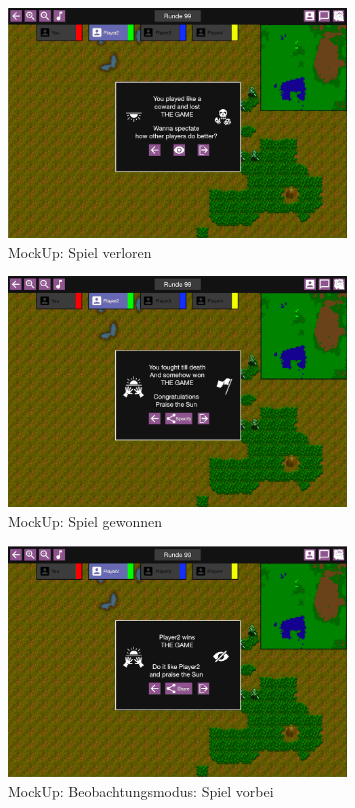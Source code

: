 \documentclass[12pt, titlepage]{scrartcl}
\begin{document}
			        \begin{figure}[H] 
    				    \centering
    				    \includegraphics[width=0.8\textwidth]{images/mockUps/GameLost.png}
    				    \caption{MockUp: Spiel verloren}
    				    \label{Game_Lost}
			        \end{figure}
			        \begin{figure}[H] 
    				    \centering
    				    \includegraphics[width=0.8\textwidth]{images/mockUps/GameWon.png}
    				    \caption{MockUp: Spiel gewonnen}
    				    \label{Game_Won}
			        \end{figure}
			        \begin{figure}[H] 
    				    \centering
    				    \includegraphics[width=0.8\textwidth]{images/mockUps/SpactatorEnd.png}
    				    \caption{MockUp: Beobachtungsmodus: Spiel vorbei}
    				    \label{Spactator_End}
			        \end{figure}
\end{document}
